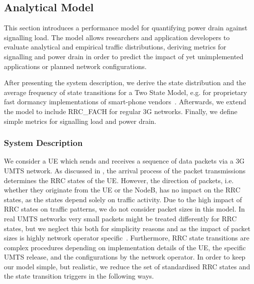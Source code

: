 \subsection{Analytical Model}\label{sec:network:performance_model:analytical_model}
This section introduces a performance model for quantifying power drain against signalling load.
The model allows researchers and application developers to evaluate analytical and empirical traffic distributions, deriving metrics for signalling and power drain in order to predict the impact of yet unimplemented applications or planned network configurations.

After presenting the system description, we derive the state distribution and the average frequency of state transitions for a Two State Model, e.g. for proprietary fast dormancy implementations of smart-phone vendors~\cite{NSN2011}. 
Afterwards, we extend the model to include \gls{RRC_FACH} for regular \gls{3G} networks.
Finally, we define simple metrics for signalling load and power drain.

\newcommand{\PacketIAT}{A}

\subsubsection*{System Description}\label{sec:network:performance_model:analytical_model:system_description}
We consider a \gls{UE} which sends and receives a sequence of data packets via a \gls{3G} \gls{UMTS} network.
As discussed in , the arrival process of the packet transmissions determines the \gls{RRC} states of the \gls{UE}.
However, the direction of packets, i.e. whether they originate from the \gls{UE} or the \gls{NodeB}, has no impact on the \gls{RRC} states, as the states depend solely on traffic activity.
Due to the high impact of \gls{RRC} states on traffic patterns, we do not consider packet sizes in this model.
In real \gls{UMTS} networks very small packets might be treated differently for \gls{RRC} states, but we neglect this both for simplicity reasons and as the impact of packet sizes is highly network operator specific~\cite{Qian2010a}.
Furthermore, \gls{RRC} state transitions are complex procedures depending on implementation details of the \gls{UE}, the specific \gls{UMTS} release, and the configurations by the network operator.
In order to keep our model simple, but realistic, we reduce the set of standardised \gls{RRC} states and the state transition triggers in the following ways. 

